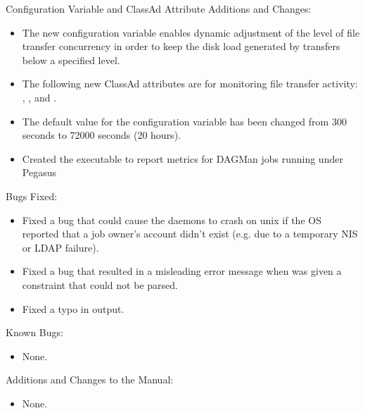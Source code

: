 \noindent Configuration Variable and ClassAd Attribute Additions and Changes:

\begin{itemize}

\item The new configuration variable
 enables dynamic
adjustment of the level of file transfer concurrency in order to
keep the disk load generated by transfers below a specified level.

\item The following new  ClassAd attributes are for
monitoring file transfer activity:
,
, and
.

\item The default value for the configuration variable
 has been changed from 300 seconds to
72000 seconds (20 hours).

\item Created the  executable to report metrics for
DAGMan jobs running under Pegasus

\end{itemize}

\noindent Bugs Fixed:

\begin{itemize}

\item Fixed a bug that could cause the daemons to crash on unix if the
OS reported that a job owner's account didn't exist (e.g. due to a
temporary NIS or LDAP failure).

\item Fixed a bug that resulted in a misleading error message when
  was given a constraint that could not
be parsed.

\item Fixed a typo in  output.

\end{itemize}

\noindent Known Bugs:

\begin{itemize}

\item None.

\end{itemize}

\noindent Additions and Changes to the Manual:

\begin{itemize}

\item None.

\end{itemize}


